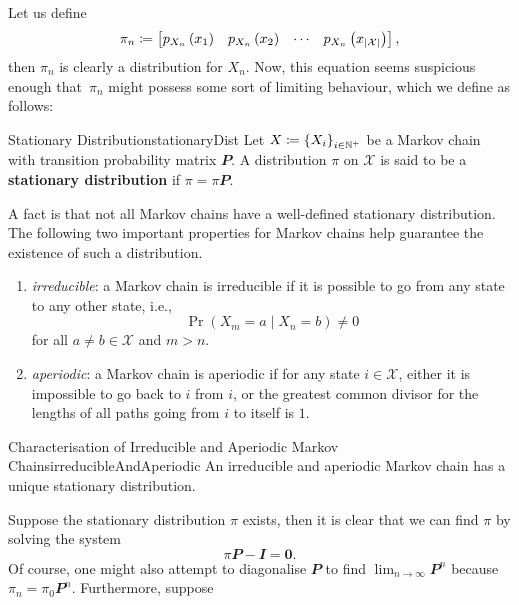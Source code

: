 \documentclass[math, code]{amznotes}
\theoremstyle{remark}
\begin{document}
Let us define 
\begin{equation*}
    \pi_n \coloneqq \begin{bmatrix}
        p_{X_{n}}\left(x_1\right) & p_{X_{n}}\left(x_2\right) & \cdots & p_{X_{n}}\left(x_{{\left\lvert {\mathcal{X}} \right\rvert}}\right)
    \end{bmatrix},
\end{equation*}
then $\pi_n$ is clearly a distribution for $X_n$. Now, this equation seems suspicious enough that~$\pi_n$ might possess some sort of limiting behaviour, which we define as follows:
\begin{dfnbox}{Stationary Distribution}{stationaryDist}
    Let $X \coloneqq \left\{X_i\right\}_{i \in \mathbb{N}^+}$ be a Markov chain with transition probability matrix $\mathbfit{P}$. A distribution $\pi$ on $\mathcal{X}$ is said to be a {\color{red} \textbf{stationary distribution}} if $\pi = \pi\mathbfit{P}$.
\end{dfnbox}
A fact is that not all Markov chains have a well-defined stationary distribution. The following two important properties for Markov chains help guarantee the existence of such a distribution.
\begin{enumerate}
    \item \textit{irreducible}: a Markov chain is irreducible if it is possible to go from any state to any other state, i.e.,
    \begin{equation*}
        \Pr\left(X_m = a \mid X_n = b\right) \neq 0
    \end{equation*}
    for all $a \neq b \in \mathcal{X}$ and $m > n$.
    \item \textit{aperiodic}: a Markov chain is aperiodic if for any state $i \in \mathcal{X}$, either it is impossible to go back to $i$ from $i$, or the greatest common divisor for the lengths of all paths going from $i$ to itself is $1$.
\end{enumerate}
\begin{thmbox}{Characterisation of Irreducible and Aperiodic Markov Chains}{irreducibleAndAperiodic}
    An irreducible and aperiodic Markov chain has a unique stationary distribution.
\end{thmbox}
Suppose the stationary distribution $\pi$ exists, then it is clear that we can find $\pi$ by solving the system 
\begin{equation*}
    \pi\mathbfit{P - I} = \mathbf{0}.
\end{equation*}
Of course, one might also attempt to diagonalise $\mathbfit{P}$ to find $\lim_{n \to \infty}\mathbfit{P}^n$ because $\pi_n = \pi_0\mathbfit{P}^n$. Furthermore, suppose 
\end{document}
